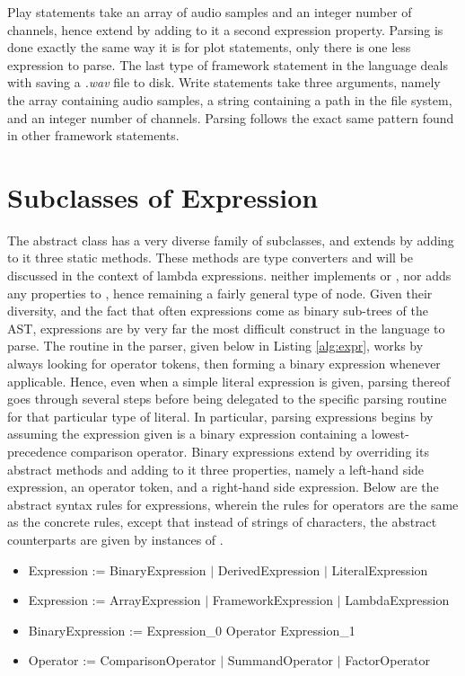 Play statements take an array of audio samples and an integer number of channels, hence extend  by adding to it a second expression property. Parsing is done exactly the same way it is for plot statements, only there is one less expression to parse. The last type of framework statement in the language deals with saving a \emph{.wav} file to disk. Write statements take three arguments, namely the array containing audio samples, a string containing a path in the file system, and an integer number of channels. Parsing follows the exact same pattern found in other framework statements.

\section{Subclasses of Expression}

The abstract class  has a very diverse family of subclasses, and extends  by adding to it three static methods. These methods are type converters and will be discussed in the context of lambda expressions.  neither implements  or , nor adds any properties to , hence remaining a fairly general type of node. Given their diversity, and the fact that often expressions come as binary sub-trees of the AST, expressions are by very far the most difficult construct in the language to parse. The  routine in the parser, given below in Listing \ref{alg:expr}, works by always looking for operator tokens, then forming a binary expression whenever applicable. Hence, even when a simple literal expression is given, parsing thereof goes through several steps before being delegated to the specific parsing routine for that particular type of literal. In particular, parsing expressions begins by assuming the expression given is a binary expression containing a lowest-precedence comparison operator. Binary expressions extend  by overriding its abstract methods and adding to it three properties, namely a left-hand side expression, an operator token, and a right-hand side expression. Below are the abstract syntax rules for expressions, wherein the rules for operators are the same as the concrete rules, except that instead of strings of characters, the abstract counterparts are given by instances of .

\begin{itemize}
	\item Expression := BinaryExpression $|$ DerivedExpression $|$ LiteralExpression
	\item Expression := ArrayExpression $|$ FrameworkExpression $|$ LambdaExpression
	\item BinaryExpression := Expression\_0 Operator Expression\_1
	\item Operator := ComparisonOperator $|$ SummandOperator $|$ FactorOperator
\end{itemize}

